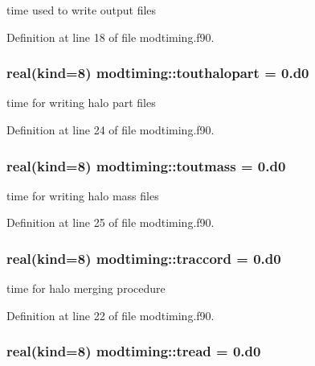 time used to write output files 



Definition at line 18 of file modtiming.\-f90.

\hypertarget{classmodtiming_ac41b305f5582ff3ca37058380003cfc7}{
\subsubsection[{touthalopart}]{\setlength{\rightskip}{0pt plus 5cm}real(kind=8) modtiming\-::touthalopart = 0.d0}}\label{classmodtiming_ac41b305f5582ff3ca37058380003cfc7}


time for writing halo part files 



Definition at line 24 of file modtiming.\-f90.

\hypertarget{classmodtiming_a03a912e0243fcfbdec3ceeae3a34963a}{
\subsubsection[{toutmass}]{\setlength{\rightskip}{0pt plus 5cm}real(kind=8) modtiming\-::toutmass = 0.d0}}\label{classmodtiming_a03a912e0243fcfbdec3ceeae3a34963a}


time for writing halo mass files 



Definition at line 25 of file modtiming.\-f90.

\hypertarget{classmodtiming_a9b8eac461e18e3b6c057420bae5b004e}{
\subsubsection[{traccord}]{\setlength{\rightskip}{0pt plus 5cm}real(kind=8) modtiming\-::traccord = 0.d0}}\label{classmodtiming_a9b8eac461e18e3b6c057420bae5b004e}


time for halo merging procedure 



Definition at line 22 of file modtiming.\-f90.

\hypertarget{classmodtiming_ab77d3fc2a7e3da662677204c1c8f7e84}{
\subsubsection[{tread}]{\setlength{\rightskip}{0pt plus 5cm}real(kind=8) modtiming\-::tread = 0.d0}}\label{classmodtiming_ab77d3fc2a7e3da662677204c1c8f7e84}


